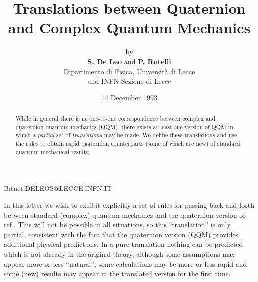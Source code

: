 


\renewcommand{\baselinestretch}{1.2}



\title{Translations between Quaternion and Complex Quantum Mechanics}
\author{by\\ {\bf S. De Leo} and  {\bf P. Rotelli}\\ Dipartimento
di Fisica, Universit\`a  di Lecce\\ and INFN-Sezione di Lecce}
\date{14 December 1993}




\maketitle


\begin{abstract}
While in general there is no one-to-one correspondence between complex and
quaternion quantum mechanics (QQM), there exists at least one version of QQM
in which a {\em partial} set of {\em translations} may be made. We define
these translations
and use the rules to obtain rapid quaternion counterparts (some of which
are new) of standard quantum mechanical results.
\end{abstract}

\vspace*{20mm}

Bitnet:DELEOS@LECCE.INFN.IT

\pagebreak

\hspace*{5mm} In this letter we wish to exhibit explicitly a set of rules
for passing back and forth between standard (complex) quantum mechanics
and the quaternion version of ref.\cite{rot1}. This will not be possible in
all situations, so this ``translation'' is only partial, consistent with
the fact that the quaternion version (QQM) provides additional physical
predictions. In a pure translation nothing can be predicted which is not
already in the original theory, although some assumptions may
appear more or less ``natural'', some calculations may be more or less
rapid and some (new) results may appear in the translated version for the
first time.

